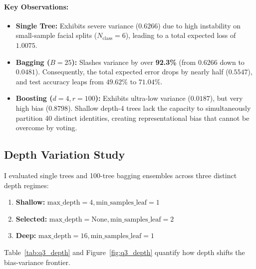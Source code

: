 \documentclass[10pt,twocolumn,letterpaper]{article}
\begin{document}
\paragraph{Key Observations:}
\begin{itemize}[leftmargin=*]
    \item \textbf{Single Tree:} Exhibits severe variance ($0.6266$) due to high instability on small-sample facial splits ($N_{\text{class}}=6$), leading to a total expected loss of $1.0075$.
    \item \textbf{Bagging ($B=25$):} Slashes variance by over \textbf{92.3\%} (from $0.6266$ down to $0.0481$). Consequently, the total expected error drops by nearly half ($0.5547$), and test accuracy leaps from $49.62\%$ to $71.04\%$.
    \item \textbf{Boosting ($d=4, r=100$):} Exhibits ultra-low variance ($0.0187$), but very high bias ($0.8798$). Shallow depth-4 trees lack the capacity to simultaneously partition 40 distinct identities, creating representational bias that cannot be overcome by voting.
\end{itemize}

\subsection{Depth Variation Study}
I evaluated single trees and 100-tree bagging ensembles across three distinct depth regimes:
\begin{enumerate}[leftmargin=*]
    \item \textbf{Shallow:} $\text{max\_depth}=4, \text{min\_samples\_leaf}=1$
    \item \textbf{Selected:} $\text{max\_depth}=\text{None}, \text{min\_samples\_leaf}=2$
    \item \textbf{Deep:} $\text{max\_depth}=16, \text{min\_samples\_leaf}=1$
\end{enumerate}
Table~\ref{tab:q3_depth} and Figure~\ref{fig:q3_depth} quantify how depth shifts the bias-variance frontier.

\begin{table}[h]
\centering
\caption{Depth variation study: Bias, variance, and variance removed by 100-tree Bagging.}
\label{tab:q3_depth}
\end{table}
\end{document}
